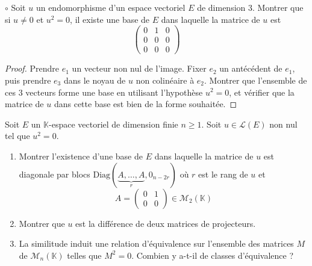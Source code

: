 \documentclass[french,a4paper]{article}
\newcommand{\K}{\mathbb{K}}
\theoremstyle{plain}
\theoremstyle{definition}
\theoremstyle{remark}
\begin{document}
\begin{ex}{$\circ$}
	Soit $u$ un endomorphisme d'un espace vectoriel $E$ de dimension $3$. Montrer que si $u\ne 0$ et $u^2=0$, il existe une base de $E$ dans laquelle la matrice de $u$ est $$\begin{pmatrix}
		0&1&0\\
		0&0&0\\
		0&0&0
	\end{pmatrix}$$
\end{ex}
\begin{proof}
	Prendre $e_1$ un vecteur non nul de l'image. Fixer $e_2$ un antécédent de $e_1$, puis prendre $e_3$ dans le noyau de $u$ non colinéaire à $e_2$. Montrer que l'ensemble de ces $3$ vecteurs forme une base en utilisant l'hypothèse $u^2=0$, et vérifier que la matrice de $u$ dans cette base est bien de la forme souhaitée.
\end{proof}

\begin{ex}{}
	Soit $E$ un $\K$-espace vectoriel de dimension finie $n\geqslant 1$. Soit $u\in\mathcal{L}(E)$ non nul tel que $u^2=0$.
	\begin{enumerate}
		\item Montrer l'existence d'une base de $E$ dans laquelle la matrice de $u$ est diagonale par blocs $\text{Diag}(\underbrace{A,\ldots,A}_{r},0_{n-2r})$ où $r$ est le rang de $u$ et $$A=\begin{pmatrix}
			0&1\\
			0&0
		\end{pmatrix}\in\mathcal{M}_2(\K)$$
		\item Montrer que $u$ est la différence de deux matrices de projecteurs.
		\item La similitude induit une relation d'équivalence sur l'ensemble des matrices $M$ de $\mathcal{M}_n(\K)$ telles que $M^2=0$. Combien y a-t-il de classes d'équivalence ?
	\end{enumerate}
\end{ex}
\end{document}
